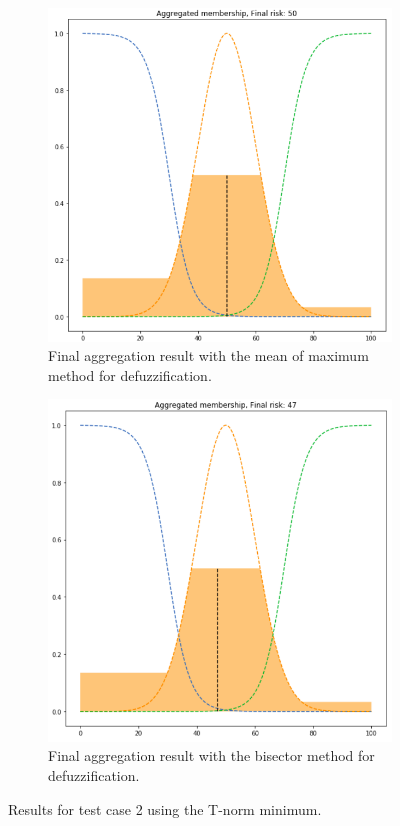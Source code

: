\begin{figure}[ht]
\begin{subfigure}{.5\textwidth}
\end{subfigure}
\begin{subfigure}{.5\textwidth}
  \centering
  \includegraphics[width=.8\linewidth]{figures/second/min-mom.png}  
  \caption{Final aggregation result with the mean of maximum method for defuzzification.}
  \label{fig:2min-mom}
\end{subfigure}
\begin{subfigure}{.5\textwidth}
  \centering
  \includegraphics[width=.8\linewidth]{figures/second/min-bisector.png}  
  \caption{Final aggregation result with the bisector method for defuzzification.}
  \label{fig:2min-bisector}
\end{subfigure}
\caption{Results for test case 2 using the T-norm minimum.}
\label{fig:testcase2min}
\end{figure}


